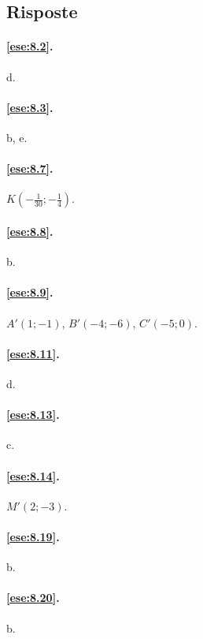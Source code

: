 
\subsection{Risposte}

\begingroup
\hypersetup{linkcolor=black}

\paragraph{\ref{ese:8.2}.}
d.

\paragraph{\ref{ese:8.3}.}
b, e.

\paragraph{\ref{ese:8.7}.}
$K\left(-\frac{1}{30};-\frac{1}{4}\right)$.

\paragraph{\ref{ese:8.8}.}
b.

\paragraph{\ref{ese:8.9}.}
$A'(1;-1)$, $B'(-4;-6)$, $C'(-5;0)$.

\paragraph{\ref{ese:8.11}.}
d.

\paragraph{\ref{ese:8.13}.}
c.

\paragraph{\ref{ese:8.14}.}
$M'(2;-3)$.

\paragraph{\ref{ese:8.19}.}
b.

\paragraph{\ref{ese:8.20}.}
b.

